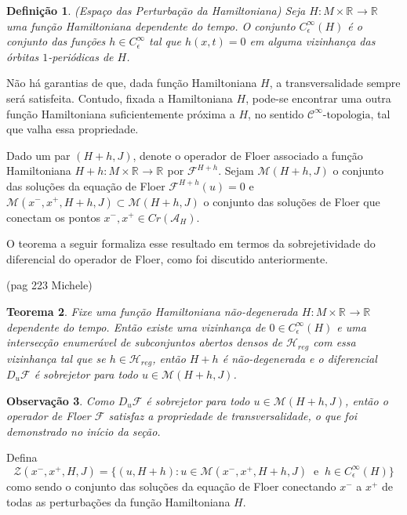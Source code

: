 \documentclass[12pt]{book}
\newtheorem{teorema}{Teorema}[section]
\newtheorem{definicao}[teorema]{Definição}
\newtheorem{observacao}[teorema]{Observação}
\newcommand{\cktopologia}[1]{\mathcal{C}^{#1}\text{-topologia}}
\newcommand{\diferencialfloerponto}[1]{D_{#1}\operadorFloer}
\newcommand{\energiafinitaM}{\mathcal{M}}
\newcommand{\energiafinitaMHamiltoniana}[1]{\energiafinitaM(#1, J)}
\newcommand{\energiafinitaMconectanteHamiltoniana}{\energiafinitaM(x^{-}, x^{+},H+h,J)}
\newcommand{\funcionalH}{\mathcal{A}_{H}}
\newcommand{\hamiltonianasRegulares}{\mathcal{H}_{reg}}
\newcommand{\operadorFloer}{\mathcal{F}}
\newcommand{\orbitasConectantesZ}{\mathcal{Z}(x^{-}, x^{+},H, J)}
\newcommand{\paresregulares}{\mathcal{H}_{reg}}
\newcommand{\perturbacaoHamiltoniana}[1]{C^{\infty}_{\epsilon}(#1)}
\newcommand{\pontoscriticos}[1]{\textit{Cr}(#1)}
\newcommand{\real}[1]{\mathbb{R}^{#1}}
\newcommand{\reta}{\real{}}
\newcommand{\aviso}[1]{{\color{violet}(#1)}}
\begin{document}
	\begin{definicao}
		(Espaço das Perturbação da Hamiltoniana) Seja $H :M\times \reta\to \reta$ uma função Hamiltoniana dependente do tempo. O conjunto $\perturbacaoHamiltoniana{H}$ é o conjunto das funções $h \in C^{\infty}_{\epsilon}$ tal que $h(x,t) = 0$ em alguma vizinhança das órbitas $1$-periódicas de $H$.
	\end{definicao}
	
	Não há garantias de que, dada função Hamiltoniana $H$, a transversalidade sempre será satisfeita. Contudo, fixada a Hamiltoniana $H$, pode-se encontrar uma outra função Hamiltoniana suficientemente próxima a $H$, no sentido $\cktopologia{\infty}$, tal que valha essa propriedade. 
	
	Dado um par $(H+h, J)$, denote o operador de Floer associado a função Hamiltoniana $H+h:M\times \reta \to \reta$ por $\operadorFloer^{H+h}$. Sejam $\energiafinitaMHamiltoniana{H+h}$ o conjunto das soluções da equação de Floer $\operadorFloer^{H+h}(u)=0$ e  $\energiafinitaMconectanteHamiltoniana \subset \energiafinitaMHamiltoniana{H+h}$ o conjunto das soluções de Floer que conectam os pontos $x^{-}, x^{+} \in \pontoscriticos{\funcionalH}$.
	
	O teorema a seguir formaliza esse resultado em termos da sobrejetividade do diferencial do operador de Floer, como foi discutido anteriormente.
	
	\aviso{pag 223 Michele}
	
	\begin{teorema}
		Fixe uma função Hamiltoniana não-degenerada $H:M\times \reta\to \reta$ dependente do tempo. Então existe uma vizinhança de $0 \in \perturbacaoHamiltoniana{H}$ e uma intersecção enumerável de subconjuntos abertos densos de $\hamiltonianasRegulares$ com essa vizinhança tal que se $h\in \paresregulares$, então $H+h$ é não-degenerada e o diferencial $\diferencialfloerponto{u}$ é sobrejetor para todo $u \in \energiafinitaMHamiltoniana{H+h}$.
	\end{teorema}
	
	\begin{observacao}
		Como $\diferencialfloerponto{u}$ é sobrejetor para todo $u \in \energiafinitaMHamiltoniana{H+h}$, então o operador de Floer $\operadorFloer$ satisfaz a propriedade de transversalidade, o que foi demonstrado no início da seção.
	\end{observacao}
	
	Defina 
	$$
	\orbitasConectantesZ = \{ (u, H+h): u \in  \energiafinitaMconectanteHamiltoniana \;\;\text{e}\;\; h\in \perturbacaoHamiltoniana{H} \}
	$$
	como sendo o conjunto das soluções da equação de Floer conectando $x^{-}$ a $x^{+}$ de todas as perturbações da função Hamiltoniana $H$.
	
\end{document}
